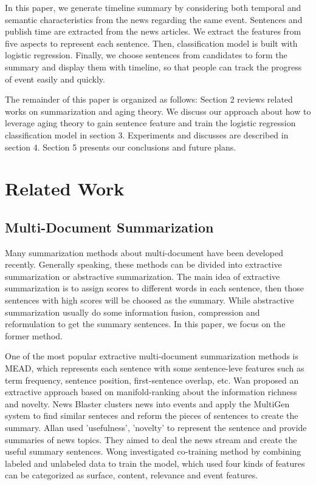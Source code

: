 \documentclass{acm_proc_article-sp}
\begin{document}
In this paper, we generate timeline summary by considering both temporal and semantic characteristics from the news regarding the same event.
Sentences and publish time are extracted from the news articles. 
We extract the features from five aspects to represent each sentence. 
Then, classification model is built with logistic regression. 
Finally, we choose sentences from candidates to form the summary and display them with timeline, so that people can track the progress of event easily and quickly.

The remainder of this paper is organized as follows: Section 2 reviews related works on summarization and aging theory. 
We discuss our approach about how to leverage aging theory to gain sentence feature and train the logistic regression classification model in section 3. 
Experiments and discusses are described in section 4. 
Section 5 presents our conclusions and future plans.


%
\section{Related Work}

\subsection{Multi-Document Summarization}

Many summarization methods about multi-document have been developed recently. 
Generally speaking, these methods can be divided into extractive summarization or abstractive summarization.
The main idea of extractive summarization is to assign scores to different words in each sentence, then those sentences with high scores will be choosed as the summary.
While abstractive summarization usually do some information fusion\cite{barzilay1999information}, compression\cite{2002-Knight-p91-107} and reformulation\cite{mckeown1999towards} to get the summary sentences.
In this paper, we focus on the former method.

One of the most popular extractive multi-document summarization methods is MEAD\cite{2004-Radev-p919-938}, which represents each sentence with some sentence-leve features such as term frequency, sentence position, first-sentence overlap, etc. 
Wan\cite{wan2007manifold} proposed an extractive approach based on manifold-ranking about the information richness and novelty.
News Blaster\cite{McKeown2003} clusters news into events and apply the MultiGen system to find similar senteces and reform the pieces of sentences to create the summary.
Allan\cite{2001-Allan-p10-18} used 'usefulness', 'novelty' to represent the sentence and provide summaries of news topics. 
They aimed to deal the news stream and create the useful summary sentences.
Wong\cite{2008-Wong-p985-992} investigated co-training method by combining labeled and unlabeled data to train the model, which used four kinds of features can be categorized as surface, content, relevance and event features.
\end{document}
